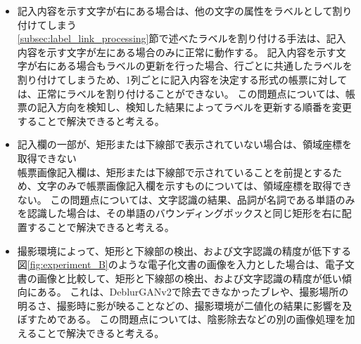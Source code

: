 \begin{itemize}
    \item 記入内容を示す文字が右にある場合は、他の文字の属性をラベルとして割り付けてしまう\\
        \ref{subsec:label_link_processing}節で述べたラベルを割り付ける手法は、記入内容を示す文字が左にある場合のみに正常に動作する。
        記入内容を示す文字が右にある場合もラベルの更新を行った場合、行ごとに共通したラベルを割り付けてしまうため、1列ごとに記入内容を決定する形式の帳票に対しては、正常にラベルを割り付けることができない。
        この問題点については、帳票の記入方向を検知し、検知した結果によってラベルを更新する順番を変更することで解決できると考える。
    \item 記入欄の一部が、矩形または下線部で表示されていない場合は、領域座標を取得できない\\
        帳票画像記入欄は、矩形または下線部で示されていることを前提とするため、文字のみで帳票画像記入欄を示すものについては、領域座標を取得できない。
        この問題点については、文字認識の結果、品詞が名詞である単語のみを認識した場合は、その単語のバウンディングボックスと同じ矩形を右に配置することで解決できると考える。
    \item 撮影環境によって、矩形と下線部の検出、および文字認識の精度が低下する\\
        図\ref{fig:experiment_B}のような電子化文書の画像を入力とした場合は、電子文書の画像と比較して、矩形と下線部の検出、および文字認識の精度が低い傾向にある。
        これは、DeblurGANv2で除去できなかったブレや、撮影場所の明るさ、撮影時に影が映ることなどの、撮影環境が二値化の結果に影響を及ぼすためである。
        この問題点については、陰影除去などの別の画像処理を加えることで解決できると考える。
\end{itemize}